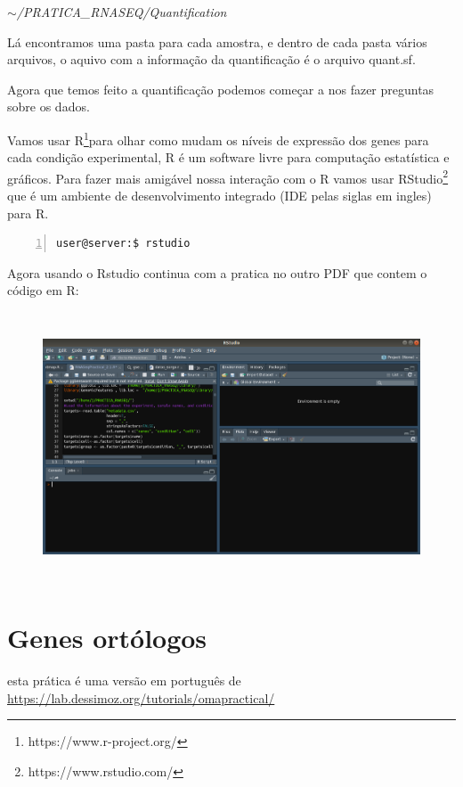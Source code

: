 \documentclass[letter,11pt]{book}
\begin{document}
\emph{$\sim$/PRATICA\_RNASEQ/Quantification}

Lá encontramos uma pasta para cada amostra, e dentro de cada pasta vários arquivos, o aquivo com a informação da quantificação é o arquivo quant.sf.

Agora que temos feito a quantificação podemos começar a nos fazer preguntas sobre os dados.

Vamos usar R\footnote{https://www.r-project.org/}para olhar como mudam os níveis de expressão dos genes para cada condição experimental, R é um software livre para computação estatística e gráficos. Para fazer mais amigável nossa interação com o R vamos usar RStudio\footnote{https://www.rstudio.com/} que é um ambiente de desenvolvimento integrado (IDE pelas siglas em ingles) para R.

\begin{Verbatim}[commandchars=!\{\}, numbers=left,label= Criando Salmon index ,frame=topline,fontsize=\scriptsize]
user@server:$ rstudio
\end{Verbatim}


Agora usando o Rstudio continua com a pratica no outro PDF que contem o código em R:

\begin{figure}[h]
\centering
   \includegraphics[height=8cm]{Figs/rstudio_tela.png}
  \caption[Rstudio tela]{\label{logo_rstudio}}
\end{figure}



\chapter{Genes ortólogos}

esta prática é uma versão em português de \url{https://lab.dessimoz.org/tutorials/omapractical/}
\end{document}
